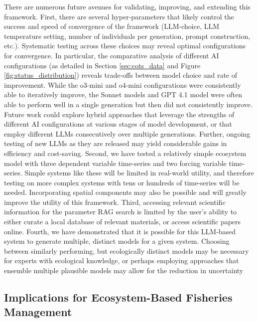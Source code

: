 There are numerous future avenues for validating, improving, and extending this framework. First, there are several hyper-parameters that likely control the success and speed of convergence of the framework (LLM-choice, LLM temperature setting, number of individuals per generation, prompt construction, etc.). Systematic testing across these choices may reveal optimal configurations for convergence. In particular, the comparative analysis of different AI configurations (as detailed in Section \ref{sec:cots_data} and Figure \ref{fig:status_distribution}) reveals trade-offs between model choice and rate of improvement. While the o3-mini and o4-mini configurations were consistently able to iteratively improve, the Sonnet models and GPT 4.1 model were often able to perform well in a single generation but then did not consistently improve. Future work could explore hybrid approaches that leverage the strengths of different AI configurations at various stages of model development, or that employ different LLMs consecutively over multiple generations. Further, ongoing testing of new LLMs as they are released may yield considerable gains in efficiency and cost-saving. Second, we have tested a relatively simple ecosystem model with three dependent variable time-series and two forcing variable time-series. Simple systems like these will be limited in real-world utility, and therefore testing on more complex systems with tens or hundreds of time-series will be needed. Incorporating spatial components may also be possible and will greatly improve the utility of this framework. Third, accessing relevant scientific information for the parameter RAG search is limited by the user's ability to either curate a local database of relevant materials, or access scientific papers online. Fourth, we have demonstrated that it is possible for this LLM-based system to generate multiple, distinct models for a given system. Choosing between similarly performing, but ecologically distinct models may be necessary for experts with ecological knowledge, or perhaps employing approaches that ensemble multiple plausible models may allow for the reduction in uncertainty \citep{baker2017ensemble,gaardmark2013biological,vollert2024unlocking}

\subsection{Implications for Ecosystem-Based Fisheries Management}

